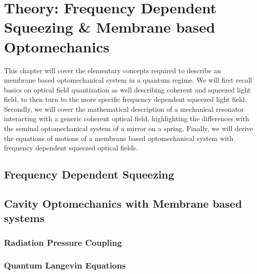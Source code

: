 \chapter{Theory: Frequency Dependent Squeezing \& Membrane based Optomechanics}
This chapter will cover the elementary concepts required to describe an membrane based optomechanical system in a quantum regime. We will first recall basics on optical field quantization as well describing coherent and squeezed light field, to then turn to the more specific frequency dependent squeezed light field. Secondly, we will cover the mathematical description of a mechanical resonator interacting with a generic coherent optical field, highlighting the differences with the seminal optomechanical system of a mirror on a spring. Finally, we will derive the equations of motions of a membrane based optomechanical system with frequency dependent squeezed optical fields. 
\minitoc
\newpage


\section{Frequency Dependent Squeezing}

\section{Cavity Optomechanics with Membrane based systems }
\subsection{Radiation Pressure Coupling}
\subsection{Quantum Langevin Equations}


